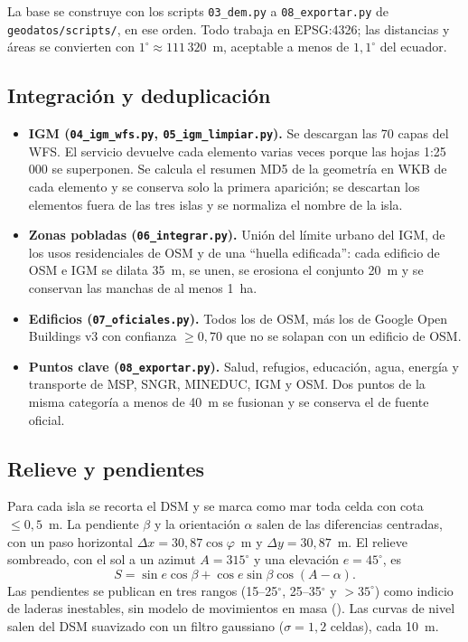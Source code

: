 \documentclass{sosg-informe}
\begin{document}
La base se construye con los scripts \texttt{03\_dem.py} a \texttt{08\_exportar.py} de \texttt{geodatos/scripts/}, en ese orden. Todo trabaja en EPSG:4326; las distancias y áreas se convierten con $1^\circ \approx 111\,320$~m, aceptable a menos de $1{,}1^\circ$ del ecuador.

\subsection{Integración y deduplicación}
\begin{itemize}
  \item \textbf{IGM (\texttt{04\_igm\_wfs.py}, \texttt{05\_igm\_limpiar.py}).} Se descargan las 70 capas del WFS. El servicio devuelve cada elemento varias veces porque las hojas 1:25\,000 se superponen. Se calcula el resumen MD5 de la geometría en WKB de cada elemento y se conserva solo la primera aparición; se descartan los elementos fuera de las tres islas y se normaliza el nombre de la isla.
  \item \textbf{Zonas pobladas (\texttt{06\_integrar.py}).} Unión del límite urbano del IGM, de los usos residenciales de OSM y de una \enquote{huella edificada}: cada edificio de OSM e IGM se dilata 35~m, se unen, se erosiona el conjunto 20~m y se conservan las manchas de al menos 1~ha.
  \item \textbf{Edificios (\texttt{07\_oficiales.py}).} Todos los de OSM, más los de Google Open Buildings v3 con confianza $\geq 0{,}70$ que no se solapan con un edificio de OSM.
  \item \textbf{Puntos clave (\texttt{08\_exportar.py}).} Salud, refugios, educación, agua, energía y transporte de MSP, SNGR, MINEDUC, IGM y OSM. Dos puntos de la misma categoría a menos de 40~m se fusionan y se conserva el de fuente oficial.
\end{itemize}

\subsection{Relieve y pendientes}
Para cada isla se recorta el DSM y se marca como mar toda celda con cota $\leq 0{,}5$~m. La pendiente $\beta$ y la orientación $\alpha$ salen de las diferencias centradas, con un paso horizontal $\Delta x = 30{,}87\cos\varphi$~m y $\Delta y = 30{,}87$~m. El relieve sombreado, con el sol a un azimut $A = 315^\circ$ y una elevación $e = 45^\circ$, es
\begin{equation}
  S = \sin e \cos\beta + \cos e \sin\beta \cos(A - \alpha).
\end{equation}
Las pendientes se publican en tres rangos (15--25$^\circ$, 25--35$^\circ$ y $>35^\circ$) como indicio de laderas inestables, sin modelo de movimientos en masa (). Las curvas de nivel salen del DSM suavizado con un filtro gaussiano ($\sigma = 1{,}2$ celdas), cada 10~m.
\end{document}
